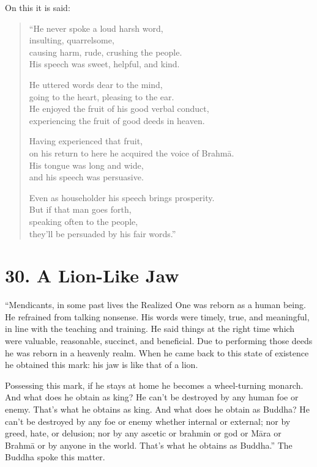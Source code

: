 \documentclass[12pt,openany]{book}%
\begin{document}
On this it is said: 

\begin{verse}%
“He never spoke a loud harsh word, \\
insulting, quarrelsome, \\
causing harm, rude, crushing the people. \\
His speech was sweet, helpful, and kind. 

He uttered words dear to the mind, \\
going to the heart, pleasing to the ear. \\
He enjoyed the fruit of his good verbal conduct, \\
experiencing the fruit of good deeds in heaven. 

Having experienced that fruit, \\
on his return to here he acquired the voice of \textsanskrit{Brahmā}. \\
His tongue was long and wide, \\
and his speech was persuasive. 

Even as householder his speech brings prosperity. \\
But if that man goes forth, \\
speaking often to the people, \\
they’ll be persuaded by his fair words.” 

%
\end{verse}

\section*{30. A Lion-Like Jaw }

“Mendicants, in some past lives the Realized One was reborn as a human being. He refrained from talking nonsense. His words were timely, true, and meaningful, in line with the teaching and training. He said things at the right time which were valuable, reasonable, succinct, and beneficial. Due to performing those deeds he was reborn in a heavenly realm. When he came back to this state of existence he obtained this mark: his jaw is like that of a lion. 

Possessing this mark, if he stays at home he becomes a wheel-turning monarch. And what does he obtain as king? He can’t be destroyed by any human foe or enemy. That’s what he obtains as king. And what does he obtain as Buddha? He can’t be destroyed by any foe or enemy whether internal or external; nor by greed, hate, or delusion; nor by any ascetic or brahmin or god or \textsanskrit{Māra} or \textsanskrit{Brahmā} or by anyone in the world. That’s what he obtains as Buddha.” The Buddha spoke this matter. 
\end{document}
